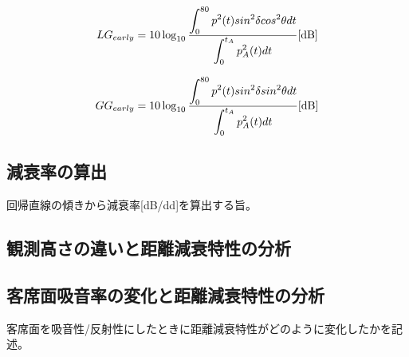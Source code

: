 \begin{equation}
  \label{eq:}
  LG_{early} = 10\log_{10}{\frac{\displaystyle\int_0^{80}p^2(t)sin^2{\delta}cos^2{\theta}dt}{\displaystyle\int_0^{t_A}p_{A}^2(t)dt}} \textrm{[dB]}
\end{equation}

\begin{equation}
  \label{eq:}
  GG_{early} = 10\log_{10}{\frac{\displaystyle\int_0^{80}p^2(t)sin^2{\delta}sin^2{\theta}dt}{\displaystyle\int_0^{t_A}p_{A}^2(t)dt}} \textrm{[dB]}
\end{equation}

\subsection{減衰率の算出}
回帰直線の傾きから減衰率[dB/dd]を算出する旨。
\subsection{観測高さの違いと距離減衰特性の分析}
\subsection{客席面吸音率の変化と距離減衰特性の分析}
客席面を吸音性/反射性にしたときに距離減衰特性がどのように変化したかを記述。

